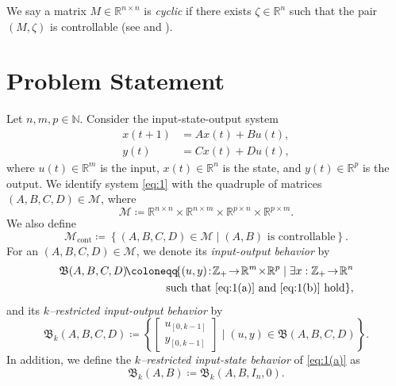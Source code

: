 \documentclass[journal,twoside,web]{ieeecolor}
\newcommand{\set}[2]{\left\{#1 \mid #2\right\}}
\begin{document}
We say a matrix $M\in\mathbb{R}^{n\times n}$ is \emph{cyclic} if there exists $\zeta\in\mathbb{R}^n$ such that the pair $(M,\zeta)$ is controllable (see \cite[p. 67]{trentelmancontrol} and \cite[Def. 7.7.4]{bernstein2018scalar}).   

\section{Problem Statement}
\label{sec:II}

Let $n,m,p\in\mathbb{N}$. Consider the input-state-output system
\begin{subequations}
\label{eq:1}
\begin{align}
\label{eq:1(a)}
x(t+1)&=Ax(t)+Bu(t), \\
\label{eq:1(b)}
y(t)&=Cx(t)+Du(t),
\end{align}
\end{subequations}
where $u(t)\in\mathbb{R}^m$ is the input, $x(t)\in\mathbb{R}^n$ is the state, and $y(t)\in\mathbb{R}^p$ is the output. We identify system \eqref{eq:1} with the quadruple of matrices $(A,B,C,D)\in\mathcal{M}$, where
\begin{equation*}
\mathcal{M}\coloneqq \mathbb{R}^{n\times n}\times\mathbb{R}^{n\times m}\times\mathbb{R}^{p\times n}\times\mathbb{R}^{p\times m}.
\end{equation*}
We also define
\begin{equation}
\mathcal{M}_\text{cont}\coloneqq\set{(A,B,C,D)\in\mathcal{M}}{(A,B)\text{ is controllable}}.
\end{equation}
For an $(A,B,C,D)\in\mathcal{M}$, we denote its \emph{input-output behavior} by
\begin{equation}
\begin{split}
\mathfrak{B}(A,B,C,D)
\!\coloneqq\!\{(u,y)\!:\!\mathbb{Z}_+\!\rightarrow\! \mathbb{R}^m\!\times\!\mathbb{R}^p\mid\exists x:\mathbb{Z}_+\!\rightarrow\!\mathbb{R}^n\\
\text{ such that }\eqref{eq:1(a)}\text{ and }\eqref{eq:1(b)}\text{ hold}\},
\end{split}
\end{equation}
and its \emph{$k$--restricted input-output behavior} by
\begin{equation}
\mathfrak{B}_k(A,B,C,D)\!\coloneqq\!\set{\!\begin{bmatrix}
u_{[0,k-1]} \\ y_{[0,k-1]}
\end{bmatrix}}{(u,y)\in\mathfrak{B}(A,B,C,D)\!}\!.
\end{equation}
In addition, we define the \emph{$k$--restricted input-state behavior} of \eqref{eq:1(a)} as
\begin{equation}
\mathfrak{B}_k(A,B)\coloneqq\mathfrak{B}_k(A,B,I_n,0).
\end{equation}
\end{document}
